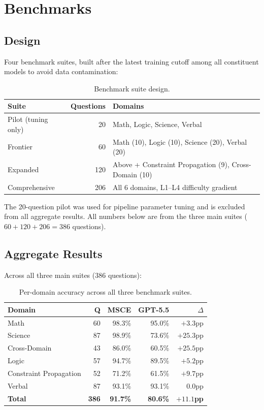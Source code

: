 \documentclass[11pt,a4paper]{article}
\begin{document}
\section{Benchmarks}

\subsection{Design}

Four benchmark suites, built after the latest training cutoff among all constituent models to avoid data contamination:

\begin{table}[ht]
\centering
\caption{Benchmark suite design.}
\label{tab:suites}
\begin{tabular}{lrl}
\toprule
\textbf{Suite} & \textbf{Questions} & \textbf{Domains} \\
\midrule
Pilot (tuning only) & 20 & Math, Logic, Science, Verbal \\
Frontier & 60 & Math (10), Logic (10), Science (20), Verbal (20) \\
Expanded & 120 & Above + Constraint Propagation (9), Cross-Domain (10) \\
Comprehensive & 206 & All 6 domains, L1--L4 difficulty gradient \\
\bottomrule
\end{tabular}
\end{table}

The 20-question pilot was used for pipeline parameter tuning and is excluded from all aggregate results. All numbers below are from the three main suites ($60 + 120 + 206 = 386$ questions).

\subsection{Aggregate Results}

Across all three main suites (386 questions):

\begin{table}[ht]
\centering
\caption{Per-domain accuracy across all three benchmark suites.}
\label{tab:aggregate}
\begin{tabular}{lrrrr}
\toprule
\textbf{Domain} & \textbf{Q} & \textbf{MSCE} & \textbf{GPT-5.5} & $\Delta$ \\
\midrule
Math & 60 & 98.3\% & 95.0\% & $+3.3$pp \\
Science & 87 & 98.9\% & 73.6\% & $+25.3$pp \\
Cross-Domain & 43 & 86.0\% & 60.5\% & $+25.5$pp \\
Logic & 57 & 94.7\% & 89.5\% & $+5.2$pp \\
Constraint Propagation & 52 & 71.2\% & 61.5\% & $+9.7$pp \\
Verbal & 87 & 93.1\% & 93.1\% & $0.0$pp \\
\midrule
\textbf{Total} & \textbf{386} & \textbf{91.7\%} & \textbf{80.6\%} & \textbf{$+11.1$pp} \\
\bottomrule
\end{tabular}
\end{table}
\end{document}
